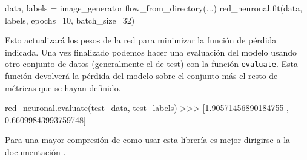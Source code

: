 \begin{python}
data, labels = image_generator.flow_from_directory(...)
red_neuronal.fit(data, labels, epochs=10, batch_size=32)
\end{python}

Esto actualizará los pesos de la red para minimizar la función de pérdida
indicada. Una vez finalizado podemos hacer una evaluación del modelo usando
otro conjunto de datos (generalmente el de test) con la función
\texttt{evaluate}. Esta función devolverá la pérdida del modelo sobre el
conjunto más el resto de métricas que se hayan definido.

\begin{python}
red_neuronal.evaluate(test_data, test_labels)
>>> [1.90571456890184755 , 0.66099843993759748]
\end{python}

Para una mayor compresión de como usar esta librería es mejor dirigirse a la documentación \parencite{keras_doc}.

